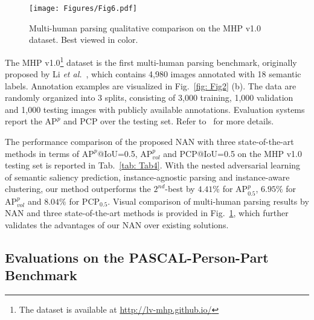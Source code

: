 \documentclass[10pt,twocolumn,letterpaper]{article}
\theoremstyle{definition}
\theoremstyle{remark}
\begin{document}
\begin{figure}[t]
	\begin{center}
		\texttt{[image: Figures/Fig6.pdf]}
	\end{center}
	\vspace{-4mm}
	\small
	\caption{\small Multi-human parsing qualitative comparison on the MHP v1.0~\cite{li2017towards} dataset. Best viewed in color.}
	\label{fig: Fig6}
\end{figure}

The MHP v1.0\footnote{The dataset is available at \url{http://lv-mhp.github.io/}} dataset is the first multi-human parsing benchmark, originally proposed by Li \emph{et al.}~\cite{li2017towards}, which contains 4{,}980 images annotated with 18 semantic labels. Annotation examples are visualized in Fig.~\ref{fig: Fig2} (b). The data are randomly organized into 3 splits, consisting of 3{,}000 training, 1{,}000 validation and 1{,}000 testing images with publicly available annotations. Evaluation systems report the $\mathrm{AP}^{p}$ and PCP over the testing set. Refer to~\cite{li2017towards} for more details.

The performance comparison of the proposed NAN with three state-of-the-art methods in terms of $\mathrm{AP}^{p}$@IoU=0.5, $\mathrm{AP}^{p}_{vol}$ and PCP@IoU=0.5 on the MHP v1.0~\cite{li2017towards} testing set is reported in Tab.~\ref{tab: Tab4}. With the nested adversarial learning of semantic saliency prediction, instance-agnostic parsing and instance-aware clustering, our method outperforms the $2^{nd}$-best by $4.41\%$ for $\mathrm{AP}^{p}_{0.5}$, $6.95\%$ for $\mathrm{AP}^{p}_{vol}$ and $8.04\%$ for PCP$_{0.5}$. Visual comparison of multi-human parsing results by NAN and three state-of-the-art methods is provided in Fig.~\ref{fig: Fig6}, which further validates the advantages of our NAN over existing solutions.

\subsection{Evaluations on the PASCAL-Person-Part Benchmark}
\end{document}
